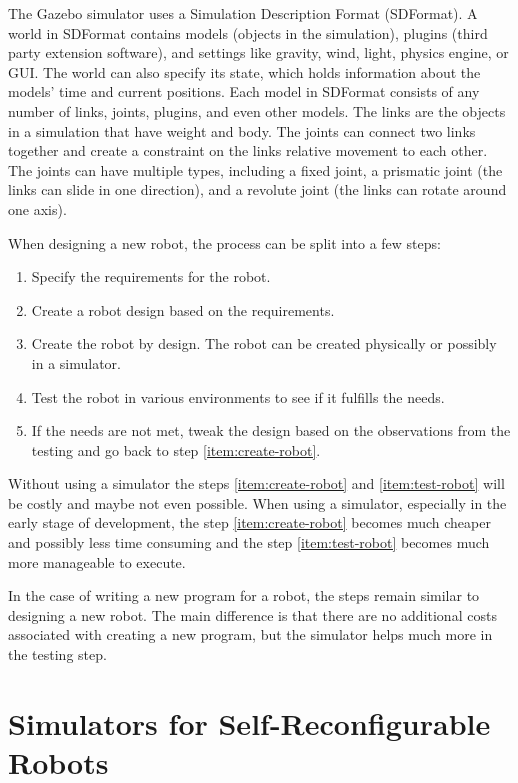 \documentclass[
  printed, %
  color,   %
  notable, %
  oneside, %
  nolof,   %
  nolot,   %
  nocover,
]{fithesis3}
\begin{document}
The Gazebo simulator uses a Simulation Description Format (SDFormat)\cite{sdf}.
A world in SDFormat contains models (objects in the simulation), plugins (third party extension software), and settings like gravity, wind, light, physics engine, or GUI.
The world can also specify its state, which holds information about the models' time and current positions.
Each model in SDFormat consists of any number of links, joints, plugins, and even other models.
The links are the objects in a simulation that have weight and body.
The joints can connect two links together and create a constraint on the links relative movement to each other.
The joints can have multiple types, including a fixed joint, a prismatic joint (the links can slide in one direction), and a revolute joint (the links can rotate around one axis).

When designing a new robot, the process can be split into a few steps:
\begin{enumerate}
    \item Specify the requirements for the robot.
    \item Create a robot design based on the requirements.
    \item Create the robot by design.\label{item:create-robot}
    The robot can be created physically or possibly in a simulator.
    \item Test the robot in various environments to see if it fulfills the needs.\label{item:test-robot}
    \item If the needs are not met, tweak the design based on the observations from the testing and go back to step \ref{item:create-robot}.
\end{enumerate}
Without using a simulator the steps \ref{item:create-robot} and \ref{item:test-robot} will be costly and maybe not even possible.
When using a simulator, especially in the early stage of development, the step \ref{item:create-robot} becomes much cheaper and possibly less time consuming and the step \ref{item:test-robot} becomes much more manageable to execute.

In the case of writing a new program for a robot, the steps remain similar to designing a new robot.
The main difference is that there are no additional costs associated with creating a new program, but the simulator helps much more in the testing step.

\section{Simulators for Self-Reconfigurable Robots}
\end{document}
